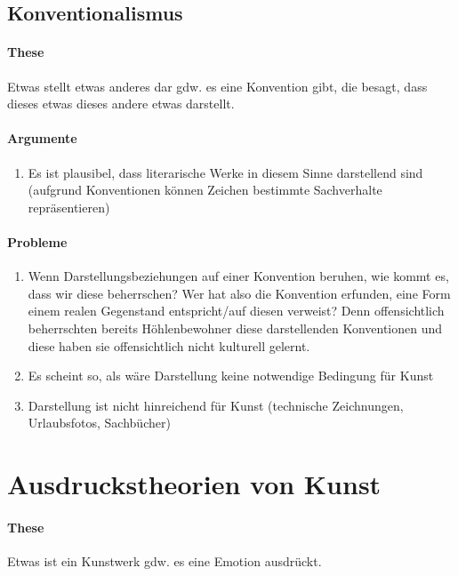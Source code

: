 \documentclass[../main.tex]{subfiles}
\begin{document}
\subsection{Konventionalismus}
\paragraph{These} Etwas stellt etwas anderes dar gdw. es eine Konvention gibt, die besagt, dass dieses etwas dieses andere etwas darstellt. 
\paragraph{Argumente}
\begin{enumerate}
	\item Es ist plausibel, dass literarische Werke in diesem Sinne darstellend sind (aufgrund Konventionen können Zeichen bestimmte Sachverhalte repräsentieren)
\end{enumerate}
\paragraph{Probleme}
\begin{enumerate}
	\item Wenn Darstellungsbeziehungen auf einer Konvention beruhen, wie kommt es, dass wir diese beherrschen? Wer hat also die Konvention erfunden, eine Form einem realen Gegenstand entspricht/auf diesen verweist? Denn offensichtlich beherrschten bereits Höhlenbewohner diese darstellenden Konventionen und diese haben sie offensichtlich nicht kulturell gelernt.
	\item Es scheint so, als wäre Darstellung keine notwendige Bedingung für Kunst
	\item Darstellung ist nicht hinreichend für Kunst (technische Zeichnungen, Urlaubsfotos, Sachbücher)
\end{enumerate}

\section{Ausdruckstheorien von Kunst}
\paragraph{These} Etwas ist ein Kunstwerk gdw. es eine Emotion ausdrückt.
\end{document}
